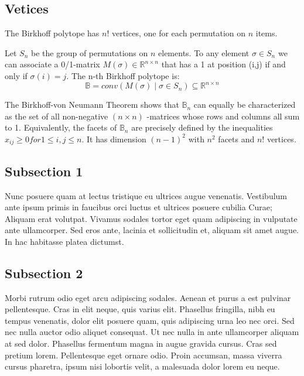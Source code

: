 \subsection{Vetices}
The Birkhoff polytope has $n!$ vertices, one for each permutation on $n$ items. 




 Let $S_n$ be the group of permutations on $n$ elements. To any element $\sigma \in S_n$ we can associate a 0/1-matrix $M( \sigma ) \in \mathbb{R}^{n \times n}$ that has a 1 at position (i,j) if and only if $\sigma(i)=j$. The n-th Birkhoff polytope is:
\begin{equation}
\mathbb{B} = conv(M( \sigma ) \mid \sigma \in S_n ) \subseteq \mathbb{R}^{n \times n}
\label{eqn:Einstein}
\end{equation}	

The Birkhoff-von Neumann Theorem shows that $\mathbb{B}_n$ can equally be characterized as the set of all non-negative $(n \times n)$ -matrices whose rows and columns all sum to 1. Equivalently, the facets of $\mathbb{B}_n$ are precisely defined by the inequalities $x_{ij} \geq 0 for 1 \leq i, j \leq n$. It has dimension $(n-1)^2$ with $n^2$ facets and $n!$ vertices.



\subsection{Subsection 1}

Nunc posuere quam at lectus tristique eu ultrices augue venenatis. Vestibulum ante ipsum primis in faucibus orci luctus et ultrices posuere cubilia Curae; Aliquam erat volutpat. Vivamus sodales tortor eget quam adipiscing in vulputate ante ullamcorper. Sed eros ante, lacinia et sollicitudin et, aliquam sit amet augue. In hac habitasse platea dictumst.



\subsection{Subsection 2}
Morbi rutrum odio eget arcu adipiscing sodales. Aenean et purus a est pulvinar pellentesque. Cras in elit neque, quis varius elit. Phasellus fringilla, nibh eu tempus venenatis, dolor elit posuere quam, quis adipiscing urna leo nec orci. Sed nec nulla auctor odio aliquet consequat. Ut nec nulla in ante ullamcorper aliquam at sed dolor. Phasellus fermentum magna in augue gravida cursus. Cras sed pretium lorem. Pellentesque eget ornare odio. Proin accumsan, massa viverra cursus pharetra, ipsum nisi lobortis velit, a malesuada dolor lorem eu neque.

